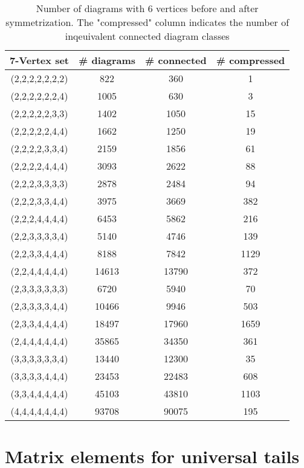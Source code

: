 \documentclass[twocolumn,secnumarabic,amssymb, nobibnotes, aps, prd]{revtex4-2}
\begin{document}
\begin{table}[]
\centering
\begin{tabular}{|c|c|c|c|}
\hline
7-Vertex set & \# diagrams & \# connected & \# compressed \\ \hline
(2,2,2,2,2,2,2) & 822 & 360 & 1\\
 (2,2,2,2,2,2,4) & 1005 & 630 & 3\\
 (2,2,2,2,2,3,3) & 1402 & 1050 & 15\\
 (2,2,2,2,2,4,4) & 1662 & 1250 & 19\\     
 (2,2,2,2,3,3,4) & 2159 & 1856 & 61 \\
(2,2,2,2,4,4,4) & 3093 & 2622 & 88\\
 (2,2,2,3,3,3,3) & 2878 & 2484 & 94 \\
(2,2,2,3,3,4,4) & 3975 & 3669 & 382\\
 (2,2,2,4,4,4,4) & 6453 & 5862 & 216\\
 (2,2,3,3,3,3,4) & 5140 & 4746 & 139\\
 (2,2,3,3,4,4,4) & 8188 & 7842 & 1129\\
 (2,2,4,4,4,4,4) & 14613 & 13790 & 372\\
 (2,3,3,3,3,3,3)  & 6720 & 5940 & 70\\
 (2,3,3,3,3,4,4)  & 10466 & 9946 & 503\\
 (2,3,3,4,4,4,4)  & 18497 & 17960 & 1659\\
(2,4,4,4,4,4,4)  & 35865 & 34350 & 361 \\ 
 (3,3,3,3,3,3,4)  & 13440 & 12300 & 35\\
 (3,3,3,3,4,4,4)  & 23453 & 22483 & 608         \\
 (3,3,4,4,4,4,4)  & 45103 & 43810 & 1103         \\
(4,4,4,4,4,4,4)  & 93708 & 90075 & 195 \\ \hline
\end{tabular}
\caption{Number of diagrams with $6$ vertices before and after symmetrization. The "compressed" column indicates the number of inqeuivalent connected diagram classes}
\label{tab:tab67vert2}
\end{table}

\section{Matrix elements for universal tails} \label{AppExplicitDiscTerms}
\end{document}
